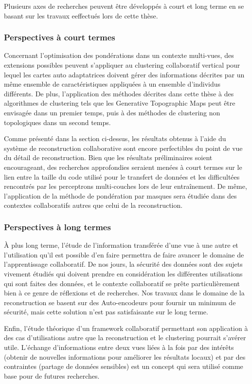 \documentclass[a4paper]{article}
\begin{document}
Plusieurs axes de recherches peuvent être développés à court et long terme en se basant sur les travaux eeffectués lors de cette thèse. 

\subsubsection{Perspectives à court termes}

Concernant l'optimisation des pondérations dans un contexte multi-vues, des extensions possibles peuvent s'appliquer au clustering collaboratif vertical pour lequel les cartes auto adaptatrices doivent gérer des informations décrites par un même ensemble de caractéristiques appliquées à un ensemble d'individus différents. De plus, l'application des méthodes décrites dans cette thèse à des algorithmes de clustering tels que les Generative Topographic Maps peut être envisagée dans un premier temps, puis à des méthodes de clustering non topologiques dans un second temps.

Comme présenté dans la section ci-dessus, les résultats obtenus à l'aide du système de reconstruction collaborative sont encore perfectibles du point de vue du détail de reconstruction. Bien que les résultats préliminaires soient encourageant, des recherches approfondies seraient menées à court termes sur le lien entre la taille du code utilisé pour le transfert de données et les difficultées rencontrés par les perceptrons multi-couches lors de leur entraînement. De même, l'application de la méthode de pondération par masques sera étudiée dans des contextes collaboratifs autres que celui de la reconstruction.

\subsubsection{Perspectives à long termes}
À plus long terme, l'étude de l'information transférée d'une vue à une autre et l'utilisation qu'il est possible d'en faire permettra de faire avancer le domaine de l'apprentissage collaboratif. De nos jours, la sécurité des données sont des sujets vivement étudiés qui doivent prendre en considération les différentes utilisations qui sont faites des données, et le contexte collaboratif se prête particulièrement bien à ce genre de réflexions et de recherches. Nos travaux dans le domaine de la reconstruction se basent sur des Auto-encodeurs pour fournir un minimum de sécurité, mais cette solution n'est pas satisfaisante sur le long terme.

Enfin, l'étude théorique d'un framework collaboratif permettant son application à des cas d'utilisations autre que la reconstruction et le clustering pourrait s'avérer utile. L'échange d'informations entre deux vues liées à la fois par des intérêts (obtenir de nouvelles informations pour améliorer les résultats locaux) et par des contraintes (partage de données sensibles) est un concept qui sera utilisé comme base pour de futures recherches.


    
    
\end{document}
